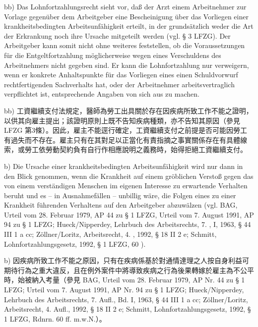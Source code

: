 \documentclass[12pt]{article}
\begin{document}
\begin{sourcepara}[title={原文E.224}]
bb) Das Lohnfortzahlungsrecht sieht vor, daß der Arzt einem Arbeitnehmer zur Vorlage gegenüber dem Arbeitgeber eine Bescheinigung über das Vorliegen einer krankheitsbedingten Arbeitsunfähigkeit erteilt, in der grundsätzlich weder die Art der Erkrankung noch ihre Ursache mitgeteilt werden (vgl. § 3 LFZG). Der Arbeitgeber kann somit nicht ohne weiteres feststellen, ob die Voraussetzungen für die Entgeltfortzahlung möglicherweise wegen eines Verschuldens des Arbeitnehmers nicht gegeben sind. Er kann die Lohnfortzahlung nur verweigern, wenn er konkrete Anhaltspunkte für das Vorliegen eines einen Schuldvorwurf rechtfertigenden Sachverhalts hat, oder der Arbeitnehmer arbeitsvertraglich verpflichtet ist, entsprechende Angaben von sich aus zu machen.
\end{sourcepara}
\begin{transpara}
bb) 工資繼續支付法規定，醫師為勞工出具關於存在因疾病所致工作不能之證明，以供其向雇主提出；該證明原則上既不告知疾病種類，亦不告知其原因（參見 LFZG 第3條）。因此，雇主不能逕行確定，工資繼續支付之前提是否可能因勞工有過失而不存在。雇主只有在其對足以正當化有責指摘之事實關係存在有具體線索，或勞工依勞動契約負有自行作相應說明之義務時，始得拒絕工資繼續支付。
\end{transpara}

\begin{sourcepara}[title={原文E.225}]
b) Die Ursache einer krankheitsbedingten Arbeitsunfähigkeit wird nur dann in den Blick genommen, wenn die Krankheit auf einem gröblichen Verstoß gegen das von einem verständigen Menschen im eigenen Interesse zu erwartende Verhalten beruht und es -- in Ausnahmefällen -- unbillig wäre, die Folgen eines zu einer Krankheit führenden Verhaltens auf den Arbeitgeber abzuwälzen (vgl. BAG, Urteil vom 28. Februar 1979, AP \abbrNr{} 44 zu § 1 LFZG, Urteil vom 7. August 1991, AP \abbrNr{} 94 zu § 1 LFZG; Hueck/Nipperdey, Lehrbuch des Arbeitsrechts, 7. \abbrAufl{}, \abbrBd{} I, 1963, § 44 III 1 a cc; Zöllner/Loritz, Arbeitsrecht, 4. \abbrAufl{}, 1992, § 18 II 2 e; Schmitt, Lohnfortzahlungsgesetz, 1992, § 1 LFZG, \abbrRdnrn{} 60 \abbrFF{} \abbrMwN{}).
\end{sourcepara}
\begin{transpara}
b) 因疾病所致工作不能之原因，只有在疾病係基於對通情達理之人按自身利益可期待行為之重大違反，且在例外案件中將導致疾病之行為後果轉嫁於雇主為不公平時，始被納入考量（參見 BAG, Urteil vom 28. Februar 1979, AP Nr. 44 zu § 1 LFZG; Urteil vom 7. August 1991, AP Nr. 94 zu § 1 LFZG; Hueck/Nipperdey, Lehrbuch des Arbeitsrechts, 7. Aufl., Bd. I, 1963, § 44 III 1 a cc; Zöllner/Loritz, Arbeitsrecht, 4. Aufl., 1992, § 18 II 2 e; Schmitt, Lohnfortzahlungsgesetz, 1992, § 1 LFZG, Rdnrn. 60 ff. m.w.N.）。
\end{transpara}
\end{document}
